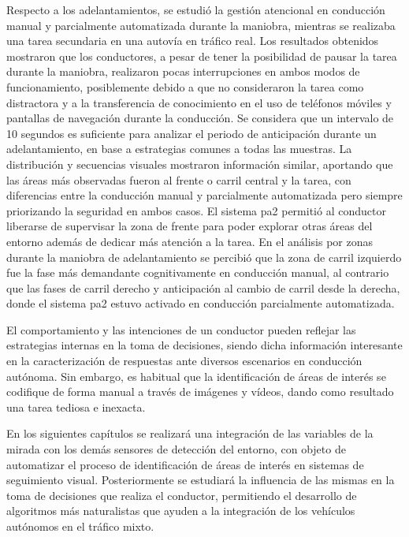 Respecto a los adelantamientos, se estudió la gestión atencional en conducción manual y parcialmente automatizada durante la maniobra, mientras se realizaba una tarea secundaria en una autovía en tráfico real. Los resultados obtenidos mostraron que los conductores, a pesar de tener la posibilidad de pausar la tarea durante la maniobra, realizaron pocas interrupciones en ambos modos de funcionamiento, posiblemente debido a que no consideraron la tarea como distractora y a la transferencia de conocimiento en el uso de teléfonos móviles y pantallas de navegación durante la conducción. Se considera que un intervalo de 10 segundos es suficiente para analizar el periodo de anticipación durante un adelantamiento, en base a estrategias comunes a todas las muestras. La distribución y secuencias visuales mostraron información similar, aportando que las áreas más observadas fueron al frente o carril central y la tarea, con diferencias entre la conducción manual y parcialmente automatizada pero siempre priorizando la seguridad en ambos casos. El sistema \gls{pa2} permitió al conductor liberarse de supervisar la zona de frente para poder explorar otras áreas del entorno además de dedicar más atención a la tarea. En el análisis por zonas durante la maniobra de adelantamiento se percibió que la zona de carril izquierdo fue la fase más demandante cognitivamente en conducción manual, al contrario que las fases de carril derecho y anticipación al cambio de carril desde la derecha, donde el sistema \gls{pa2} estuvo activado en conducción parcialmente automatizada.

El comportamiento y las intenciones de un conductor pueden reflejar las estrategias internas en la toma de decisiones, siendo dicha información interesante en la caracterización de respuestas ante diversos escenarios en conducción autónoma. Sin embargo, es habitual que la identificación de áreas de interés se codifique de forma manual a través de imágenes y vídeos, dando como resultado una tarea tediosa e inexacta.

En los siguientes capítulos se realizará una integración de las variables de la mirada con los demás sensores de detección del entorno, con objeto de automatizar el proceso de identificación de áreas de interés en sistemas de seguimiento visual. Posteriormente se estudiará la influencia de las mismas en la toma de decisiones que realiza el conductor, permitiendo el desarrollo de algoritmos más naturalistas que ayuden a la integración de los vehículos autónomos en el tráfico mixto.
